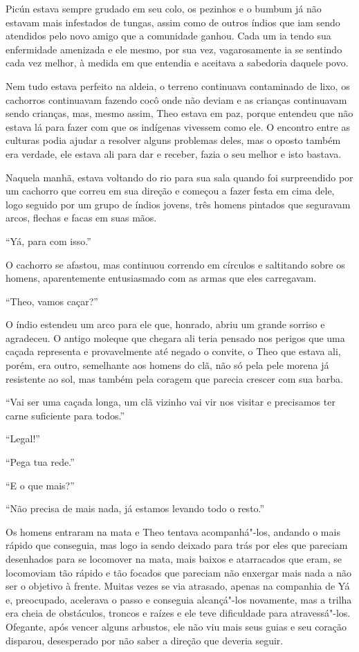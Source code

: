 Picún estava sempre grudado em seu colo, os pezinhos e o bumbum já não
estavam mais infestados de tungas, assim como de outros índios que iam
sendo atendidos pelo novo amigo que a comunidade ganhou. Cada um ia
tendo sua enfermidade amenizada e ele mesmo, por sua vez, vagarosamente
ia se sentindo cada vez melhor, à medida em que entendia e aceitava a
sabedoria daquele povo.

Nem tudo estava perfeito na aldeia, o terreno continuava contaminado de
lixo, os cachorros continuavam fazendo cocô onde não deviam e as
crianças continuavam sendo crianças, mas, mesmo assim, Theo estava em
paz, porque entendeu que não estava lá para fazer com que os indígenas
vivessem como ele. O encontro entre as culturas podia ajudar a resolver
alguns problemas deles, mas o oposto também era verdade, ele estava ali
para dar e receber, fazia o seu melhor e isto bastava.

Naquela manhã, estava voltando do rio para sua sala quando foi
surpreendido por um cachorro que correu em sua direção e começou a fazer
festa em cima dele, logo seguido por um grupo de índios jovens, três
homens pintados que seguravam arcos, flechas e facas em suas mãos.

``Yá, para com isso.''

O cachorro se afastou, mas continuou correndo em círculos e saltitando
sobre os homens, aparentemente entusiasmado com as armas que eles
carregavam.

``Theo, vamos caçar?''

O índio estendeu um arco para ele que, honrado, abriu um grande sorriso
e agradeceu. O antigo moleque que chegara ali teria pensado nos perigos
que uma caçada representa e provavelmente até negado o convite, o Theo
que estava ali, porém, era outro, semelhante aos homens do clã, não só
pela pele morena já resistente ao sol, mas também pela coragem que
parecia crescer com sua barba.

``Vai ser uma caçada longa, um clã vizinho vai vir nos visitar e
precisamos ter carne suficiente para todos.''

``Legal!''

``Pega tua rede.''

``E o que mais?''

``Não precisa de mais nada, já estamos levando todo o resto.''

Os homens entraram na mata e Theo tentava acompanhá"-los, andando o mais
rápido que conseguia, mas logo ia sendo deixado para trás por eles que
pareciam desenhados para se locomover na mata, mais baixos e atarracados
que eram, se locomoviam tão rápido e tão focados que pareciam não
enxergar mais nada a não ser o objetivo à frente. Muitas vezes se via
atrasado, apenas na companhia de Yá e, preocupado, acelerava o passo e
conseguia alcançá"-los novamente, mas a trilha era cheia de obstáculos,
troncos e raízes e ele teve dificuldade para atravessá"-los. Ofegante,
após vencer alguns arbustos, ele não viu mais seus guias e seu coração
disparou, desesperado por não saber a direção que deveria seguir.

